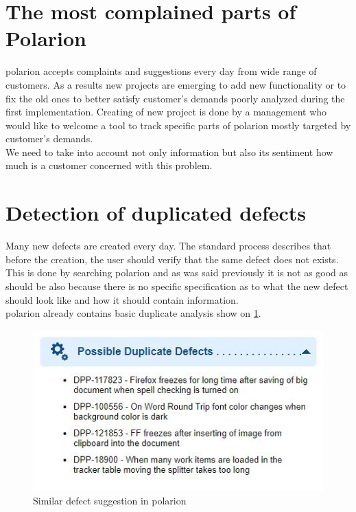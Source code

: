 \documentclass[thesis=M,english]{FITthesis}[2012/06/26]
\begin{document}
\section{The most complained parts of Polarion}

\acrshort{polarion} accepts complaints and suggestions every day from wide range of customers. As a results new projects are emerging to add new functionality or to fix the old ones to better satisfy customer's demands poorly analyzed during the first implementation. Creating of new project is done by a management who would like to welcome a tool to track specific parts of \acrshort{polarion} mostly targeted by customer's demands.\\

We need to take into account not only information but also its sentiment how much is a customer concerned with this problem. 	

\section{Detection of duplicated defects}

Many new defects are created every day. The standard process describes that before the creation, the user should verify that the same defect does not exists. This is done by searching \acrshort{polarion} and as was said previously it is not as good as should be also because there is no specific specification as to what the new defect should look like and how it should contain information.\\

\acrshort{polarion} already contains basic duplicate analysis show on \ref{fig:polarion_defect_similar}.

\begin{figure}[h!]\centering
	\includegraphics[width=1\textwidth]{pictures/polarion_defect_similar}
	\caption{Similar defect suggestion in \acrshort{polarion}}\label{fig:polarion_defect_similar}
\end{figure}
\end{document}

